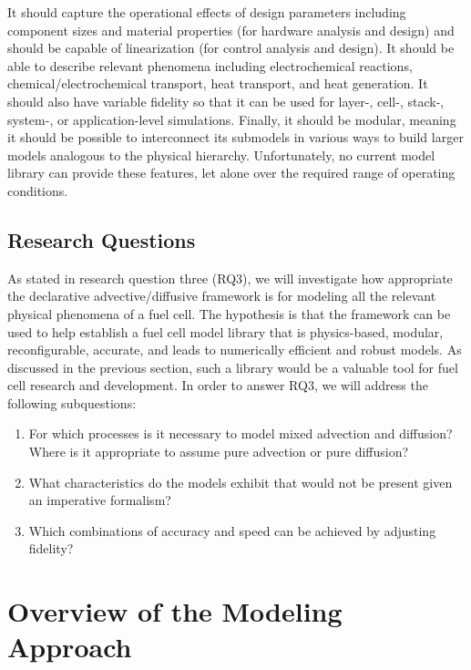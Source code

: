 It should capture the operational effects of design parameters including component sizes and material properties (for hardware analysis and design) and should be capable of linearization (for control analysis and design).  It should be able to describe relevant phenomena including electrochemical reactions, chemical\slash{}electrochemical transport, heat transport, and heat generation.  It should also have variable fidelity so that it can be used for layer-, cell-, stack-, system-, or application-level simulations.  Finally, it should be modular, meaning it should be possible to interconnect its submodels in various ways to build larger models analogous to the physical hierarchy.  Unfortunately, no current  model library can provide these features, let alone over the required range of operating conditions.


\subsection{Research Questions}%
\label{sec:FCQuestions}

As stated in research question three (RQ3), we will investigate how appropriate the declarative advective\slash{}diffusive framework is for modeling all the relevant physical phenomena of a fuel cell.  The hypothesis is that the framework can be used to help establish a fuel cell model library that is physics-based, modular, reconfigurable, accurate, and leads to numerically efficient and robust models.  As discussed in the previous section, such a library would be a valuable tool for fuel cell research and development.  In order to answer RQ3, we will address the following subquestions:
\begin{enumerate}[\bfseries RQ3a:]
  \item For which processes is it necessary to model mixed advection and diffusion?  Where is it appropriate to assume pure advection or pure diffusion?
  \item What characteristics do the models exhibit that would not be present given an imperative formalism?
  \item Which combinations of accuracy and speed can be achieved by adjusting fidelity?
\end{enumerate}



\section{Overview of the Modeling Approach}%
\label{sec:ModelingApproach}

